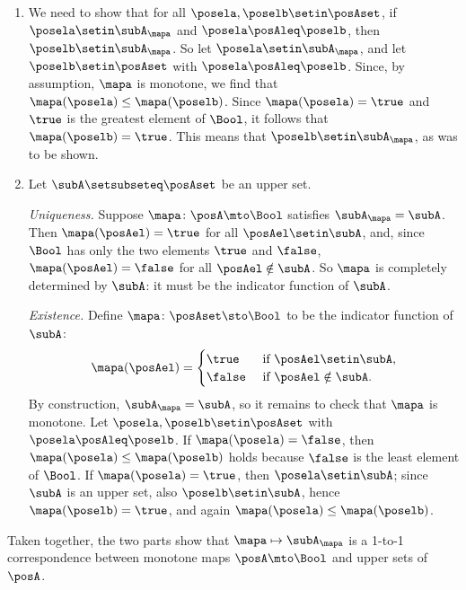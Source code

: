 \begin{gradedsolution}
\begin{enumerate}
    \item We need to show that for all $\posela, \poselb \setin \posAset$, if $\posela \setin \subA_{\mapa}$ and $\posela \posAleq \poselb$, then $\poselb \setin \subA_{\mapa}$.
    So let $\posela \setin \subA_{\mapa}$, and let $\poselb \setin \posAset$ with $\posela \posAleq \poselb$.
    Since, by assumption, $\mapa$ is monotone, we find that $\mapa(\posela) \leq \mapa(\poselb)$.
    Since $\mapa(\posela) = \true$ and $\true$ is the greatest element of $\Bool$, it follows that $\mapa(\poselb) = \true$.
    This means that $\poselb \setin \subA_{\mapa}$, as was to be shown.

    \item Let $\subA \setsubseteq \posAset$ be an upper set.

    \emph{Uniqueness.}
    Suppose $\mapa \colon \posA \mto \Bool$ satisfies $\subA_{\mapa} = \subA$.
    Then $\mapa(\posAel) = \true$ for all $\posAel \setin \subA$, and, since $\Bool$ has only the two elements $\true$ and $\false$, $\mapa(\posAel) = \false$ for all $\posAel \notin \subA$.
    So $\mapa$ is completely determined by $\subA$: it must be the indicator function of $\subA$.

    \emph{Existence.}
    Define $\mapa \colon \posAset \sto \Bool$ to be the indicator function of $\subA$:
    \begin{equation}
        \mapa(\posAel) =
        \begin{cases}
            \true  & \text{ if } \posAel \setin \subA, \\
            \false & \text{ if } \posAel \notin \subA.
        \end{cases}
    \end{equation}
    By construction, $\subA_{\mapa} = \subA$, so it remains to check that $\mapa$ is monotone.
    Let $\posela, \poselb \setin \posAset$ with $\posela \posAleq \poselb$.
    If $\mapa(\posela) = \false$, then $\mapa(\posela) \leq \mapa(\poselb)$ holds because $\false$ is the least element of $\Bool$.
    If $\mapa(\posela) = \true$, then $\posela \setin \subA$; since $\subA$ is an upper set, also $\poselb \setin \subA$, hence $\mapa(\poselb) = \true$, and again $\mapa(\posela) \leq \mapa(\poselb)$.
\end{enumerate}
Taken together, the two parts show that $\mapa \mapsto \subA_{\mapa}$ is a 1-to-1 correspondence between monotone maps $\posA \mto \Bool$ and upper sets of $\posA$.
\end{gradedsolution}
